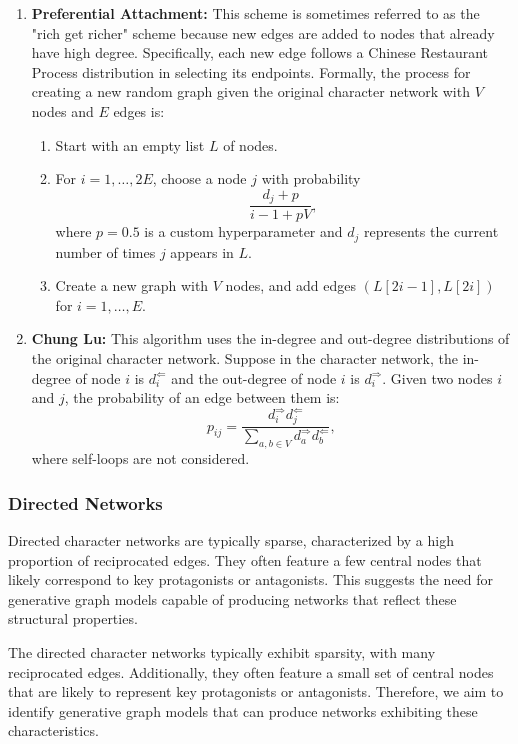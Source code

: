 \documentclass{article} %
\begin{document}
\begin{enumerate}
    \item \textbf{Preferential Attachment:} This scheme is sometimes referred to as the "rich get richer" scheme because new edges are added to nodes that already have high degree. Specifically, each new edge follows a Chinese Restaurant Process distribution in selecting its endpoints. Formally, the process for creating a new random graph given the original character network with \(V\) nodes and \(E\) edges is:
    \begin{enumerate}
        \item Start with an empty list \(L\) of nodes.
        \item For \(i = 1, \dots, 2E\), choose a node \(j\) with probability
        \[
        \frac{d_j + p}{i - 1 + pV},
        \]
        where \(p = 0.5\) is a custom hyperparameter and \(d_j\) represents the current number of times \(j\) appears in \(L\).
        \item Create a new graph with \(V\) nodes, and add edges \((L[2i-1], L[2i])\) for \(i = 1, \dots, E\).
    \end{enumerate}

    \item \textbf{Chung Lu:} This algorithm uses the in-degree and out-degree distributions of the original character network. Suppose in the character network, the in-degree of node \(i\) is \(d^\Leftarrow_i\) and the out-degree of node \(i\) is \(d^\Rightarrow_i\). Given two nodes \(i\) and \(j\), the probability of an edge between them is:
    \[
    p_{ij} = \frac{d^\Rightarrow_i d^\Leftarrow_j}{\sum_{a, b \in V} d^\Rightarrow_a d^\Leftarrow_b},
    \]
    where self-loops are not considered.
\end{enumerate}

\subsubsection{Directed Networks}

Directed character networks are typically sparse, characterized by a high proportion of reciprocated edges. They often feature a few central nodes that likely correspond to key protagonists or antagonists. This suggests the need for generative graph models capable of producing networks that reflect these structural properties.

The directed character networks typically exhibit sparsity, with many reciprocated edges. Additionally, they often feature a small set of central nodes that are likely to represent key protagonists or antagonists. Therefore, we aim to identify generative graph models that can produce networks exhibiting these characteristics.
\end{document}
